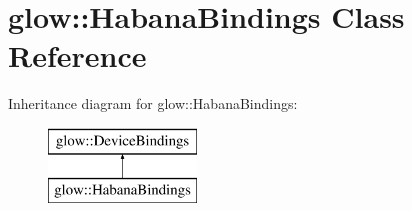 \hypertarget{classglow_1_1_habana_bindings}{}\section{glow\+:\+:Habana\+Bindings Class Reference}
\label{classglow_1_1_habana_bindings}
Inheritance diagram for glow\+:\+:Habana\+Bindings\+:\begin{figure}[H]
\begin{center}
\leavevmode
\includegraphics[height=2.000000cm]{classglow_1_1_habana_bindings}
\end{center}
\end{figure}
